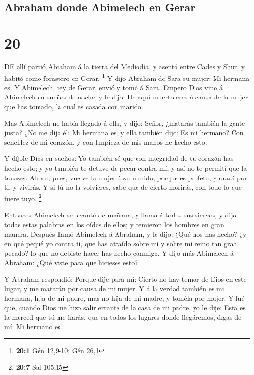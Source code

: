 \hypertarget{abraham-donde-abimelech-en-gerar}{%
\subsection{Abraham donde Abimelech en
Gerar}\label{abraham-donde-abimelech-en-gerar}}

\hypertarget{section-19}{%
\section{20}\label{section-19}}

 DE allí partió Abraham á la tierra del Mediodía, y asentó
entre Cades y Shur, y habitó como forastero en Gerar. \footnote{\textbf{20:1}
  Gén 12,9-10; Gén 26,1}  Y dijo Abraham de Sara su mujer:
Mi hermana es. Y Abimelech, rey de Gerar, envió y tomó á Sara.
 Empero Dios vino á Abimelech en sueños de noche, y le dijo:
He aquí muerto eres á causa de la mujer que has tomado, la cual es
casada con marido.

 Mas Abimelech no había llegado á ella, y dijo: Señor,
¿matarás también la gente justa?  ¿No me dijo él: Mi hermana
es; y ella también dijo: Es mi hermano? Con sencillez de mi corazón, y
con limpieza de mis manos he hecho esto.

 Y díjole Dios en sueños: Yo también sé que con integridad
de tu corazón has hecho esto; y yo también te detuve de pecar contra mí,
y así no te permití que la tocases.  Ahora, pues, vuelve la
mujer á su marido; porque es profeta, y orará por ti, y vivirás. Y si tú
no la volvieres, sabe que de cierto morirás, con todo lo que fuere tuyo.
\footnote{\textbf{20:7} Sal 105,15}

 Entonces Abimelech se levantó de mañana, y llamó á todos
sus siervos, y dijo todas estas palabras en los oídos de ellos; y
temieron los hombres en gran manera.  Después llamó
Abimelech á Abraham, y le dijo: ¿Qué nos has hecho? ¿y en qué pequé yo
contra ti, que has atraído sobre mí y sobre mi reino tan gran pecado? lo
que no debiste hacer has hecho conmigo.  Y dijo más
Abimelech á Abraham: ¿Qué viste para que hicieses esto?

 Y Abraham respondió: Porque dije para mí: Cierto no hay
temor de Dios en este lugar, y me matarán por causa de mi mujer.
 Y á la verdad también es mi hermana, hija de mi padre, mas
no hija de mi madre, y toméla por mujer.  Y fué que, cuando
Dios me hizo salir errante de la casa de mi padre, yo le dije: Esta es
la merced que tú me harás, que en todos los lugares donde llegáremos,
digas de mí: Mi hermano es.

